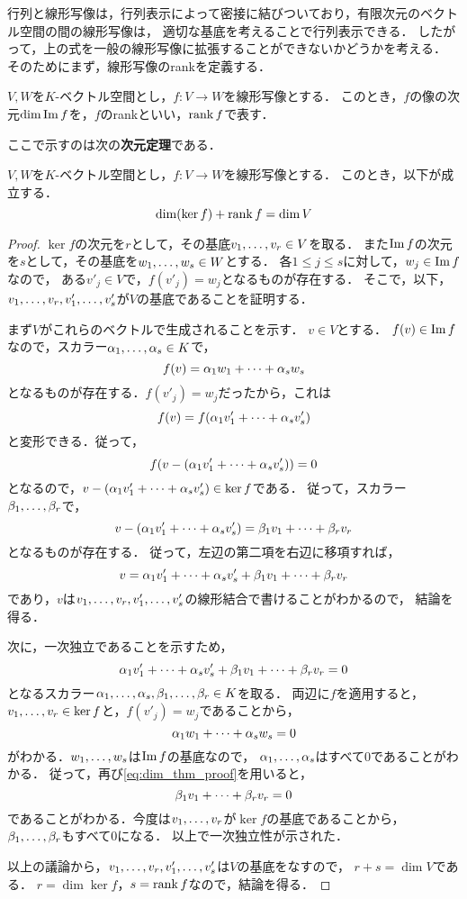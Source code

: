 行列と線形写像は，行列表示によって密接に結びついており，有限次元のベクトル空間の間の線形写像は，
適切な基底を考えることで行列表示できる．
したがって，上の式を一般の線形写像に拡張することができないかどうかを考える．
そのためにまず，線形写像のrankを定義する．
\begin{dfn}
  $V,W$を$K$-ベクトル空間とし，$f\colon V \to W$を線形写像とする．
  このとき，$f$の像の次元$\dim \im f$を，$f$のrankといい，$\rk f$で表す．
\end{dfn}
ここで示すのは次の\textbf{次元定理}である．
\begin{thm}\label{thm:dim_thm}
  $V,W$を$K$-ベクトル空間とし，$f \colon V \to W$を線形写像とする．
  このとき，以下が成立する．
  \begin{equation}
    \dim (\ker f)  + \rk f = \dim V
  \end{equation}
\end{thm}
\begin{proof}
  $\ker f$の次元を$r$として，その基底$\idxdot{v}{1}{r} \in V$を取る．
  また$\im f$の次元を$s$として，その基底を$\idxdot{w}{1}{s} \in W$とする．
  各$1 \le j \le s$に対して，$w_j \in \im f$なので，
  ある$v'_j \in V$で，$f(v'_j) = w_j$となるものが存在する．
  そこで，以下，$\idxdot{v}{1}{r},\idxdot{v'}{1}{s}$が$V$の基底であることを証明する．

  まず$V$がこれらのベクトルで生成されることを示す．
  $v \in V$とする．
  $f(v) \in \im f$なので，スカラー$\idxdot{\alpha}{1}{s}\in K$で，
  \[
    f(v) = \lncmb{\alpha}{w}{1}{s}{+}
  \]
  となるものが存在する．$f(v'_j)=w_j$だったから，これは
  \[
    f(v) = f(\lncmb{\alpha}{v'}{1}{s}{+})
  \]
  と変形できる．従って，
  \[
    f(v - (\lncmb{\alpha}{v'}{1}{s}{+})) = 0
  \]
  となるので，$v - (\lncmb{\alpha}{v'}{1}{s}{+}) \in \ker f$である．
  従って，スカラー$\idxdot{\beta}{1}{r}$で，
  \[
    v - (\lncmb{\alpha}{v'}{1}{s}{+}) = \lncmb{\beta}{v}{1}{r}{+}
  \]
  となるものが存在する．
  従って，左辺の第二項を右辺に移項すれば，
  \[
    v = \lncmb{\alpha}{v'}{1}{s}{+} + \lncmb{\beta}{v}{1}{r}{+}
  \]
  であり，$v$は$\idxdot{v}{1}{r},\idxdot{v'}{1}{s}$の線形結合で書けることがわかるので，
  結論を得る．

  次に，一次独立であることを示すため，
  \begin{equation}\label{eq:dim_thm_proof}
    \lncmb{\alpha}{v'}{1}{s}{+} + \lncmb{\beta}{v}{1}{r}{+} = 0
  \end{equation}
  となるスカラー$\idxdot{\alpha}{1}{s},\idxdot{\beta}{1}{r} \in K$を取る．
  両辺に$f$を適用すると，$\idxdot{v}{1}{r} \in \ker f$と，$f(v'_j) = w_j$であることから，
  \[
    \lncmb{\alpha}{w}{1}{s}{+} = 0
  \]
  がわかる．$\idxdot{w}{1}{s}$は$\im f$の基底なので，
  $\idxdot{\alpha}{1}{s}$はすべて0であることがわかる．
  従って，再び\eqref{eq:dim_thm_proof}を用いると，
  \[
     \lncmb{\beta}{v}{1}{r}{+} = 0
  \]
  であることがわかる．今度は$\idxdot{v}{1}{r}$が$\ker f$の基底であることから，
  $\idxdot{\beta}{1}{r}$もすべて0になる．
  以上で一次独立性が示された．

  以上の議論から，$\idxdot{v}{1}{r},\idxdot{v'}{1}{s}$は$V$の基底をなすので，
  $r+s=\dim V$である．
  $r = \dim \ker f$，$s = \rk f$なので，結論を得る．
\end{proof}
